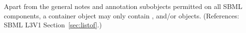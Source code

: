Apart from the general notes and annotation subobjects permitted on all
SBML components, a \ListOfRules container object may only contain
\AssignmentRule, \AlgebraicRule and/or \RateRule objects.  (References:
SBML L3V1 Section~\ref{sec:listof}.)
